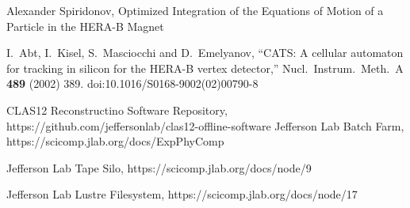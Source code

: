 \documentclass[3p,times,twocolumn]{elsarticle}
\begin{document}
\begin{thebibliography}{99}
Alexander Spiridonov, Optimized Integration of the Equations of Motion of a Particle in the HERA-B Magnet

I.~Abt, I.~Kisel, S.~Masciocchi and D.~Emelyanov,
``CATS: A cellular automaton for tracking in silicon for the HERA-B vertex detector,''
Nucl.\ Instrum.\ Meth.\ A {\bf 489} (2002) 389.
doi:10.1016/S0168-9002(02)00790-8

{CLAS12 Reconstructino Software Repository},
https://github.com/jeffersonlab/clas12-offline-software
{Jefferson Lab Batch Farm},
https://scicomp.jlab.org/docs/ExpPhyComp

{Jefferson Lab Tape Silo},
https://scicomp.jlab.org/docs/node/9

{Jefferson Lab Lustre Filesystem},
https://scicomp.jlab.org/docs/node/17

\end{thebibliography}
\end{document}

